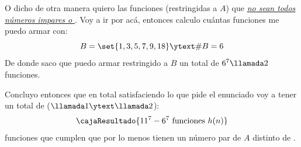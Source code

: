 \begin{enumerate}[label=\alph*)]
        O dicho de otra manera quiero las funciones (restringidas a $A$) que \underline{\textit{no sean todos números impares o }}.
        Voy a ir por acá, entonces calculo cuántas funciones me puedo armar con:
        $$
          B = \set{1,3,5,7,9,18} \ytext \#B = 6
        $$
        De donde saco que puedo armar restringido a $B$ un total de $6^7\llamada2$ funciones.

        Concluyo entonces que en total satisfaciendo lo que pide el enunciado voy a tener un total de ($\llamada1 \ytext \llamada2$):
        $$
          \cajaResultado{
            11^7 - 6^7 ~ \text{funciones}~ h(n)
          }
        $$
        funciones que cumplen que por lo menos tienen un número par de $A$ distinto de .

\end{enumerate}

\begin{aportes}
  \item {}
\end{aportes}
